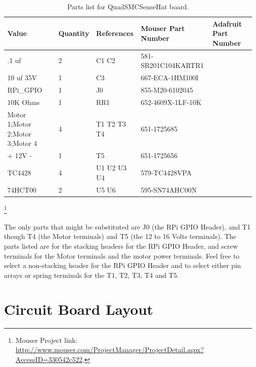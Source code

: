 \begin{table}[htdp]
\begin{centering}\begin{tabular}{|l|l|p{1in}|l|p{.5in}|}
\hline
Value&Quantity&References&Mouser Part Number&Adafruit Part Number \\
\hline
.1 uf&2&C1 C2&581-SR201C104KARTR1& \\
\hline
10 uf 35V&1&C3&667-ECA-1HM100I& \\
\hline
RPi\_GPIO&1&J0&855-M20-6102045& \\
\hline
10K Ohms&1&RR1&652-4609X-1LF-10K& \\
\hline
Motor 1;Motor 2;Motor 3;Motor 4&4&T1 T2 T3 T4&651-1725685& \\
\hline
+ 12V -&1&T5&651-1725656& \\
\hline
TC4428&4&U1 U2 U3 U4&579-TC4428VPA& \\
\hline
74HCT00&2&U5 U6&595-SN74AHC00N& \\
\hline
\end{tabular}
\caption{Parts list for QuadSMCSenseHat board.}
\end{centering}\end{table}\footnote{Mouser Project link: 
\url{http://www.mouser.com/ProjectManager/ProjectDetail.aspx?AccessID=330542c522}.}


The only parts that might be substituted are J0 (the RPi GPIO Header), and T1 
though T4 (the Motor terminals) and T5 (the 12 to 16 Volts terminals).  The parts 
listed are for the stacking headers for the RPi GPIO Header, and screw 
terminals for the Motor terminals and the motor power terminals.  Feel free to 
select a non-stacking header for the RPi GPIO Header and to select either pin 
arrays or spring terminals for the T1, T2, T3, T4 and T5.

\section{Circuit Board Layout}

